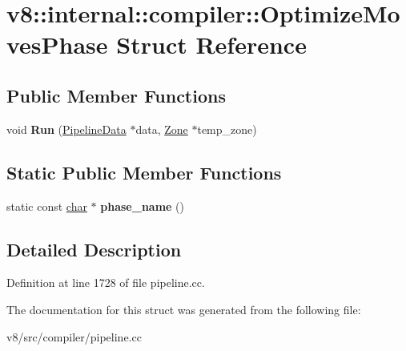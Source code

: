 \hypertarget{structv8_1_1internal_1_1compiler_1_1OptimizeMovesPhase}{}\section{v8\+:\+:internal\+:\+:compiler\+:\+:Optimize\+Moves\+Phase Struct Reference}
\label{structv8_1_1internal_1_1compiler_1_1OptimizeMovesPhase}
\subsection*{Public Member Functions}
\begin{DoxyCompactItemize}
\item 
\mbox{\label{structv8_1_1internal_1_1compiler_1_1OptimizeMovesPhase_aa4881b2a4dbf204a24dd2b95330af77c}} 
void {\bfseries Run} (\mbox{\hyperlink{classv8_1_1internal_1_1compiler_1_1PipelineData}{Pipeline\+Data}} $\ast$data, \mbox{\hyperlink{classv8_1_1internal_1_1Zone}{Zone}} $\ast$temp\+\_\+zone)
\end{DoxyCompactItemize}
\subsection*{Static Public Member Functions}
\begin{DoxyCompactItemize}
\item 
\mbox{\label{structv8_1_1internal_1_1compiler_1_1OptimizeMovesPhase_afae1d14fa5da942b409a26e69fa3a222}} 
static const \mbox{\hyperlink{classchar}{char}} $\ast$ {\bfseries phase\+\_\+name} ()
\end{DoxyCompactItemize}


\subsection{Detailed Description}


Definition at line 1728 of file pipeline.\+cc.



The documentation for this struct was generated from the following file\+:\begin{DoxyCompactItemize}
\item 
v8/src/compiler/pipeline.\+cc\end{DoxyCompactItemize}
